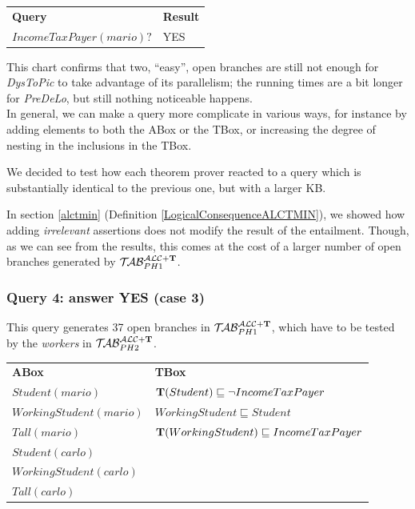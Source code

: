 \documentclass[a4paper, 11pt, oneside]{duthesis}
\newcommand{\tip}{{\bf T}}
\newcommand{\primo}{\mathrel{{\mathcal{T}\!\mathcal{AB}}}_{PH 1}^{\mathcal{ALC}+\mbox{\scriptsize $\tip$}}}
\newcommand{\secondo}{\mathrel{{\mathcal{T}\!\mathcal{AB}}}_{PH 2}^{\mathcal{ALC}+\mbox{\scriptsize $\tip$}}}
\begin{document}
\begin{tabular}{ll}
\textbf{Query} & \textbf{Result}\\
$IncomeTaxPayer(mario)?$ & YES\\
\end{tabular}

\begin{figure}[ht]
\begin{bchart}[step=300,max=300,unit=ms,scale=1.4]
    \medskip
    \medskip
    \medskip
    \medskip
\end{bchart}
\caption{}
\end{figure}

This chart confirms that two, ``easy'', open branches are still not enough for \emph{DysToPic} to take advantage of its parallelism; the running times are a bit longer for \emph{PreDeLo}, but still nothing noticeable happens.\\

In general, we can make a query more complicate in various ways, for instance by adding elements to both the ABox or the TBox, or increasing the degree of nesting in the inclusions in the TBox.

We decided to test how each theorem prover reacted to a query which is substantially identical to the previous one, but with a larger KB.

In section \ref{alctmin} (Definition \ref{LogicalConsequenceALCTMIN}), we showed how adding \emph{irrelevant} assertions does not modify the result of the entailment.
Though, as we can see from the results, this comes at the cost of a larger number of open branches generated by $\primo$.

\subsubsection{Query 4: answer YES (case 3)}



This query generates 37 open branches in $\primo$, which have to be tested by the \emph{workers} in $\secondo$.\\

\begin{tabular}{ll}
	\textbf{ABox} & \textbf{TBox}\\
	$Student(mario)$ & $\tip(Student) \sqsubseteq \neg IncomeTaxPayer$\\
	$WorkingStudent(mario)$ & $WorkingStudent \sqsubseteq Student$\\
	$Tall(mario)$ & $\tip(WorkingStudent) \sqsubseteq IncomeTaxPayer$\\
	$Student(carlo)$ &\\
	$WorkingStudent(carlo)$ &\\
	$Tall(carlo)$ &\\[0.5cm]
\end{tabular}
\end{document}
